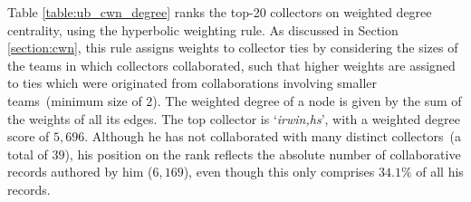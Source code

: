 Table \ref{table:ub_cwn_degree} ranks the top-20 collectors on weighted degree centrality, using the hyperbolic weighting rule.
As discussed in Section \ref{section:cwn}, this rule assigns weights to collector ties by considering the sizes of the teams in which collectors collaborated, such that higher weights are assigned to ties which were originated from collaborations involving smaller teams~(minimum size of $2$). 
The weighted degree of a node is given by the sum of the weights of all its edges.
The top collector is `\textit{irwin,hs}', with a weighted degree score of $5,696$.
Although he has not collaborated with many distinct collectors~(a total of $39$), his position on the rank reflects the absolute number of collaborative records authored by him ($6,169$), even though this only comprises $34.1\%$ of all his records. 
%
